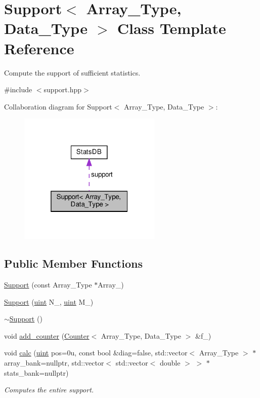 \hypertarget{class_support}{}\section{Support$<$ Array\+\_\+\+Type, Data\+\_\+\+Type $>$ Class Template Reference}
\label{class_support}


Compute the support of sufficient statistics.  




{\ttfamily \#include $<$support.\+hpp$>$}



Collaboration diagram for Support$<$ Array\+\_\+\+Type, Data\+\_\+\+Type $>$\+:\nopagebreak
\begin{figure}[H]
\begin{center}
\leavevmode
\includegraphics[width=193pt]{class_support__coll__graph}
\end{center}
\end{figure}
\subsection*{Public Member Functions}
\begin{DoxyCompactItemize}
\item 
\hyperlink{class_support_a4a0587bc6f1f268005a94fea039ea6ba}{Support} (const Array\+\_\+\+Type $\ast$Array\+\_\+)
\item 
\hyperlink{class_support_aff7d2705d6f765fcbd8958453b7dbefe}{Support} (\hyperlink{typedefs_8hpp_a91ad9478d81a7aaf2593e8d9c3d06a14}{uint} N\+\_\+, \hyperlink{typedefs_8hpp_a91ad9478d81a7aaf2593e8d9c3d06a14}{uint} M\+\_\+)
\item 
\hyperlink{class_support_a03228371869980fa356b7b86871d94e8}{$\sim$\+Support} ()
\item 
void \hyperlink{class_support_a9fc89bd8b15dcad6a4140a3c74073d10}{add\+\_\+counter} (\hyperlink{class_counter}{Counter}$<$ Array\+\_\+\+Type, Data\+\_\+\+Type $>$ \&f\+\_\+)
\item 
void \hyperlink{class_support_ab5261952be0746f188ee024e3e8c26c1}{calc} (\hyperlink{typedefs_8hpp_a91ad9478d81a7aaf2593e8d9c3d06a14}{uint} pos=0u, const bool \&diag=false, std\+::vector$<$ Array\+\_\+\+Type $>$ $\ast$array\+\_\+bank=nullptr, std\+::vector$<$ std\+::vector$<$ double $>$ $>$ $\ast$stats\+\_\+bank=nullptr)
\begin{DoxyCompactList}\small\item\em Computes the entire support. \end{DoxyCompactList}\end{DoxyCompactItemize}
